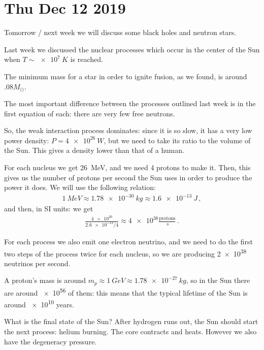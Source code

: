 \documentclass[main.tex]{subfiles}
\begin{document}
\section*{Thu Dec 12 2019}


Tomorrow / next week we will discuss some black holes and neutron stars. 

Last week we discussed the nuclear processes which occur in the center of the Sun when \(T \sim \SI{e7}{K}\) is reached. 

The minimum mass for a star in order to ignite fusion, as we found, is around \(\num{.08} M_{\odot}\). 

The most important difference between the processes outlined last week is in the first equation of each: there are very few free neutrons.

So, the weak interaction process dominates: since it is so slow, it has a very low power density: \(P = \SI{4e26}{W}\), but we need to take its ratio to the volume of the Sun. This gives a density lower than that of a human. 

For each  nucleus we get \SI{26}{MeV}, and we need 4 protons to make it. Then, this gives us the number of protons per second the Sun uses in order to produce the power it does. 
We will use the following relation: 
%
\begin{align}
  \SI{1}{MeV} \approx \SI{1.78e-30}{kg} \approx \SI{1.6e-13}{J}
\,,
\end{align}
%
and then, in SI units: we get 
%
\begin{align}
  \frac{\num{4e26}}{\num{2.6e-13} / 4} \approx \num{4e38} \frac{\text{protons}}{\SI{}{s}}
\,.
\end{align}

For each process we also emit one electron neutrino, and we need to do the first two steps of the process twice for each  nucleus, so we are producing \num{2e38} neutrinos per second. 

A proton's mass is around \(m_p \approx \SI{1}{GeV} \approx \SI{1.78e-27}{kg}\), so in the Sun there are around \num{e56} of them: this means that the typical lifetime of the Sun is around \num{e10} years. 

What is the final state of the Sun? After hydrogen runs out, the Sun should start the next process: helium burning. The core contracts and heats. However we also have the degeneracy pressure. 
\end{document}
